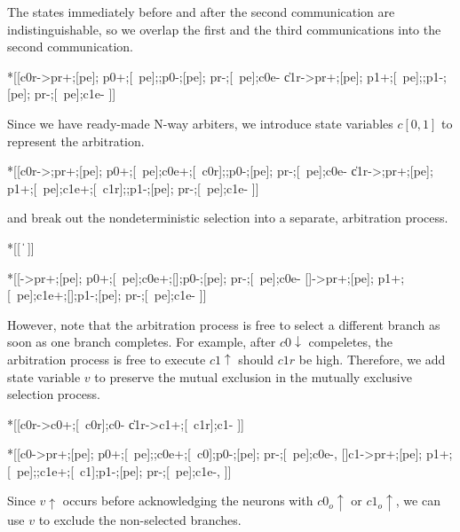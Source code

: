 \documentclass{article}
\begin{document}
\noindent
The states immediately before and after the second communication are
indistinguishable, so we overlap the first and the third communications into
the second communication.

\begin{hse}
*[[c0r->pr+;[pe];
    p0+;[~pe];;p0-;[pe];
    pr-;[~pe];c0e-
  \|c1r->pr+;[pe];
    p1+;[~pe];;p1-;[pe];
    pr-;[~pe];c1e-
 ]]
\end{hse}

\noindent
Since we have ready-made N-way arbiters, we introduce state variables $c[0,1]$
to represent the arbitration.

\begin{hse}
*[[c0r->;pr+;[pe];
    p0+;[~pe];c0e+;[~c0r];;p0-;[pe];
    pr-;[~pe];c0e-
  \|c1r->;pr+;[pe];
    p1+;[~pe];c1e+;[~c1r];;p1-;[pe];
    pr-;[~pe];c1e-
 ]]
\end{hse}

\noindent
and break out the nondeterministic selection into a separate, arbitration process.

\begin{hse}
*[[
  \|
 ]]

*[[->pr+;[pe];
    p0+;[~pe];c0e+;[];p0-;[pe];
    pr-;[~pe];c0e-
  []->pr+;[pe];
    p1+;[~pe];c1e+;[];p1-;[pe];
    pr-;[~pe];c1e-
 ]]
\end{hse}

\noindent
However, note that the arbitration process is free to select a different branch
as soon as one branch completes. For example, after $c0\!\downarrow$ compeletes,
the arbitration process is free to execute $c1\!\uparrow$ should $c1r$ be high.
Therefore, we add state variable $v$ to preserve the mutual exclusion in the
mutually exclusive selection process.

\begin{hse}
*[[c0r->c0+;[~c0r];c0-
  \|c1r->c1+;[~c1r];c1-
 ]]

*[[c0->pr+;[pe];
    p0+;[~pe];;c0e+;[~c0];p0-;[pe];
    pr-;[~pe];c0e-,
  []c1->pr+;[pe];
    p1+;[~pe];;c1e+;[~c1];p1-;[pe];
    pr-;[~pe];c1e-,
 ]]
\end{hse}

\noindent
Since $v\!\uparrow$ occurs before acknowledging the neurons with $c0_o\!\uparrow$
or $c1_o\!\uparrow$, we can use $v$ to exclude the non-selected branches.
\end{document}
